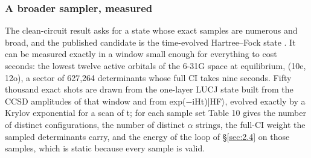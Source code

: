 \documentclass[11pt]{article}
\begin{document}
\subsubsection{A broader sampler, measured}\label{sec:3.6.3}


The clean-circuit result asks for a state whose exact samples are numerous and broad, and the published candidate is the time-evolved Hartree--Fock state \cite{MikkelsenNakagawa2025}. It can be measured exactly in a window small enough for everything to cost seconds: the lowest twelve active orbitals of the 6-31G space at equilibrium, (10e, 12o), a sector of 627,264 determinants whose full CI takes nine seconds. Fifty thousand exact shots are drawn from the one-layer LUCJ state built from the CCSD amplitudes of that window and from exp($-$iHt)|HF$\rangle$, evolved exactly by a Krylov exponential for a scan of t; for each sample set Table 10 gives the number of distinct configurations, the number of distinct $\alpha$ strings, the full-CI weight the sampled determinants carry, and the energy of the loop of \S\ref{sec:2.4} on those samples, which is static because every sample is valid.
\end{document}
